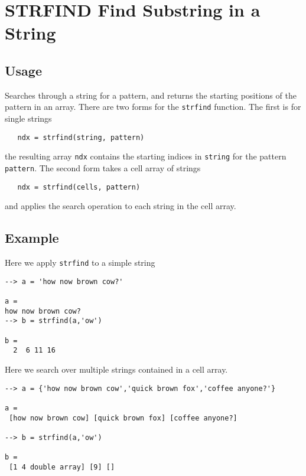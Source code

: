 \section{STRFIND Find Substring in a String}

\subsection{Usage}

Searches through a string for a pattern, and returns the starting
positions of the pattern in an array.  There are two forms for 
the \verb|strfind| function.  The first is for single strings
\begin{verbatim}
   ndx = strfind(string, pattern)
\end{verbatim}
the resulting array \verb|ndx| contains the starting indices in \verb|string|
for the pattern \verb|pattern|.  The second form takes a cell array of 
strings
\begin{verbatim}
   ndx = strfind(cells, pattern)
\end{verbatim}
and applies the search operation to each string in the cell array.
\subsection{Example}

Here we apply \verb|strfind| to a simple string
\begin{verbatim}
--> a = 'how now brown cow?'

a = 
how now brown cow?
--> b = strfind(a,'ow')

b = 
  2  6 11 16 
\end{verbatim}
Here we search over multiple strings contained in a cell array.
\begin{verbatim}
--> a = {'how now brown cow','quick brown fox','coffee anyone?'}

a = 
 [how now brown cow] [quick brown fox] [coffee anyone?] 

--> b = strfind(a,'ow')

b = 
 [1 4 double array] [9] [] 
\end{verbatim}
